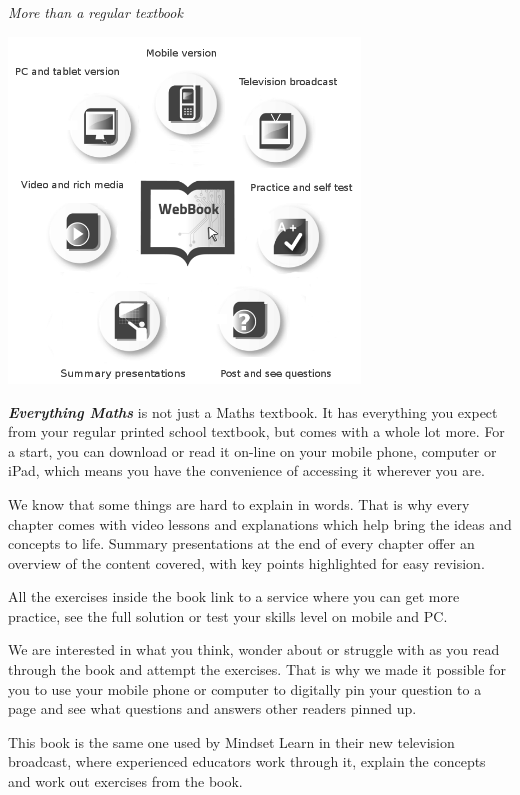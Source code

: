 
\newpage
\thispagestyle{empty}

{\normalfont\sffamily\fontsize{22}\normalfont\itshape More than a regular textbook} \par

\begin{center}
\includegraphics[width=0.70\textwidth]{../title_images/morethantextbook.png}
\end{center}

\par
{\Large
\textbf{\textit{Everything Maths}} is not just a Maths textbook. It has everything you expect from
your regular printed school textbook, but comes with a whole lot more. For a start, you can download or read it
on-line on your mobile phone, computer or iPad, which means you have the convenience of accessing
it wherever you are.\par


We know that some things are hard to explain in words. That is why every chapter comes with video
lessons and explanations which help bring the ideas and concepts to life. Summary presentations at
the end of every chapter offer an overview of the content covered, with key points highlighted for easy
revision.\par


All the exercises inside the book link to a service where you can get more practice, see the full solution
or test your skills level on mobile and PC.\par


We are interested in what you think, wonder about or struggle with as you read through the book and
attempt the exercises. That is why we made it possible for you to use your mobile phone or computer to
digitally pin your question to a page and see what questions and answers other readers pinned up.\par


This book is the same one used by Mindset Learn in their new television broadcast, where experienced educators work through it, explain the concepts and work out exercises from the book.
}




